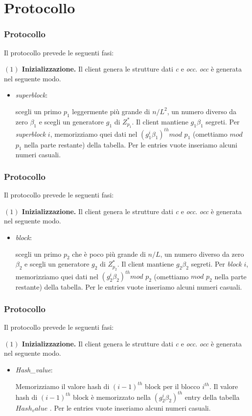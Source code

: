 \documentclass{beamer}
\begin{document}
\section{Protocollo}
\begin{frame}
\frametitle{Protocollo}
Il protocollo prevede le seguenti fasi:

\textbf{$(1)$ Inizializzazione.} Il client genera le strutture dati \textit{c} e \textit{occ}. \textit{occ} è generata nel seguente modo.

\begin{itemize}
	\item \textit{superblock}:
	
	scegli un primo $ p_{1} $ leggermente più grande
	di $n/L^{2}$, un numero diverso da zero $ \beta_{1} $ e scegli un generatore
	$g_{1}$ di $ Z^{*}_{p_{1}} $. Il client mantiene $ g_{1} \beta_{1} $ segreti. Per \textit{superblock} $ i $, memorizziamo quei dati nel $ (g^{i}_{1}\beta_{1})^{th} mod$ $p_{1}$
	(omettiamo $mod$ $ p_{1}$ nella parte restante) della tabella.
	Per le entries vuote inseriamo alcuni numeri casuali.
\end{itemize}
\end{frame}
\begin{frame}
\frametitle{Protocollo}
Il protocollo prevede le seguenti fasi:

\textbf{$(1)$ Inizializzazione.} Il client genera le strutture dati \textit{c} e \textit{occ}. \textit{occ} è generata nel seguente modo.

\begin{itemize}
\item \textit{block}:

scegli un primo $ p_{2} $ che è poco più grande di $n/L$,
un numero diverso da zero $ \beta_{2} $ e scegli un generatore $g_{2}$ di $ Z^{*}_{p_{2}} $.
Il client mantiene $ g_{2} \beta_{2} $ segreti. Per \textit{block} $ i $, memorizziamo quei dati nel $ (g^{i}_{2}\beta_{2})^{th} mod$ $p_{2}$
(omettiamo $mod$ $ p_{2}$ nella parte restante) della tabella.
Per le entries vuote inseriamo alcuni numeri casuali.
\end{itemize}
\end{frame}
\begin{frame}
\frametitle{Protocollo}
Il protocollo prevede le seguenti fasi:

\textbf{$(1)$ Inizializzazione.} Il client genera le strutture dati \textit{c} e \textit{occ}. \textit{occ} è generata nel seguente modo.

\begin{itemize}
\item \textit{Hash\_value}:

Memorizziamo il valore hash di $ (i-1)^{th} $ block
per il blocco $ i^{th} $. Il valore hash di $ (i-1)^{th} $ block
è memorizzato nella $ (g^{i}_{2}\beta_{2})^{th}$ entry della tabella $Hash_value$ .
Per le entries vuote inseriamo alcuni numeri casuali.
\end{itemize}
\end{frame}
\end{document}
